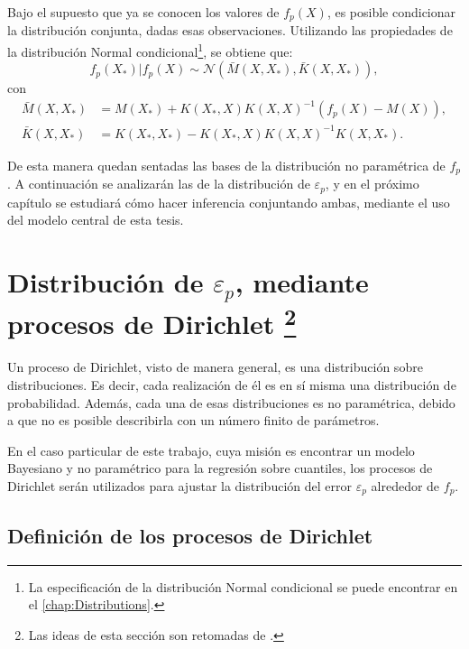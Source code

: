 Bajo el supuesto que ya se conocen los valores de $f_p(X)$, es posible condicionar la distribución conjunta, dadas esas observaciones. Utilizando las propiedades de la distribución Normal condicional\footnote{La especificaci\'on de la distribuci\'on Normal condicional se puede encontrar en el \autoref{chap:Distributions}.}, se obtiene que:
\begin{equation*}
    f_p(X_*)|f_p(X) 
    \sim \mathcal{N}
    (\bar{M}(X,X_*),\bar{K}(X,X_*)),
\end{equation*}
con
\begin{equation*}
\begin{aligned}
    \bar{M}(X,X_*) &= M(X_*) + K(X_*,X)K(X,X)^{-1}(f_p(X) - M(X)), \\
    \bar{K}(X,X_*) &= K(X_*,X_*) - K(X_*,X)K(X,X)^{-1}K(X,X_*).
\end{aligned}
\end{equation*}

De esta manera quedan sentadas las bases de la distribuci\'on no param\'etrica de $f_p$. A continuaci\'on se analizar\'an las de la distribuci\'on de $\varepsilon_p$, y en el pr\'oximo cap\'itulo se estudiar\'a c\'omo hacer inferencia conjuntando ambas, mediante el uso del modelo central de esta tesis.

\section[Distribuci\'on de $\varepsilon_p$, mediante procesos de Dirichlet]{
    Distribuci\'on de $\varepsilon_p$, mediante procesos de Dirichlet
    \footnote{Las ideas de esta secci\'on son retomadas de \cite{Yee_DirProc}.}
}

Un proceso de Dirichlet, visto de manera general, es una distribuci\'on sobre distribuciones. Es decir, cada realizaci\'on de él es en sí misma una distribuci\'on de probabilidad. Adem\'as, cada una de esas distribuciones es no param\'etrica, debido a que no es posible describirla con un n\'umero finito de par\'ametros.

En el caso particular de este trabajo, cuya misi\'on es encontrar un modelo Bayesiano y no param\'etrico para la regresi\'on sobre cuantiles, los procesos de Dirichlet ser\'an utilizados para ajustar la distribuci\'on del error $\varepsilon_p$ alrededor de $f_p$.

\subsection{Definici\'on de los procesos de Dirichlet}


